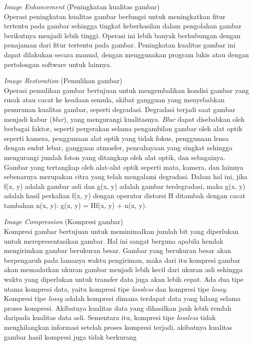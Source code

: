 \begin{packed_enum}
	\item \textit{Image Enhancement} (Peningkatan kualitas gambar)
	\\	Operasi peningkatan kualitas gambar berfungsi untuk meningkatkan fitur tertentu pada gambar sehingga tingkat keberhasilan dalam pengolahan gambar berikutnya menjadi lebih tinggi. Operasi ini lebih banyak berhubungan dengan penajaman dari fitur tertentu pada gambar. Peningkatan kualitas gambar ini dapat dilakukan secara manual, dengan menggunakan program lukis atau dengan pertolongan software untuk lainnya.
	\item \textit{Image Restoration} (Pemulihan gambar)
	\\	Operasi pemulihan gambar bertujuan untuk mengembalikan kondisi gambar yang rusak atau cacat ke keadaan semula, akibat gangguan yang menyebabkan penurunan kualitas gambar, seperti degradasi. Degradasi terjadi saat gambar menjadi kabur (\textit{blur}), yang mengurangi kualitasnya. \textit{Blur} dapat disebabkan oleh berbagai faktor, seperti pergerakan selama pengambilan gambar oleh alat optik seperti kamera, penggunaan alat optik yang tidak fokus, penggunaan lensa dengan sudut lebar, gangguan atmosfer, pencahayaan yang singkat sehingga mengurangi jumlah foton yang ditangkap oleh alat optik, dan sebagainya. Gambar yang tertangkap oleh alat-alat optik seperti mata, kamera, dan lainnya sebenarnya merupakan citra yang telah mengalami degradasi. Dalam hal ini, jika f(x, y) adalah gambar asli dan g(x, y) adalah gambar terdegradasi, maka g(x, y) adalah hasil perkalian f(x, y) dengan operator distorsi H ditambah dengan cacat tambahan n(x, y): g(x, y) = Hf(x, y) + n(x, y).
	\item \textit{Image Compression} (Kompresi gambar)
	\\	Kompresi gambar bertujuan untuk meminimalkan jumlah bit yang diperlukan untuk merepresentasikan gambar. Hal ini sangat berguna apabila hendak mengirimkan gambar berukuran besar. Gambar yang berukuran besar akan berpengaruh pada lamanya waktu pengiriman, maka dari itu kompresi gambar akan memadatkan ukuran gambar menjadi lebih kecil dari ukuran asli sehingga waktu yang diperlukan untuk transfer data juga akan lebih cepat.	
	Ada dua tipe utama kompresi data, yaitu kompresi tipe \textit{lossless} dan kompresi tipe \textit{lossy}. Kompresi tipe \textit{lossy} adalah kompresi dimana terdapat data yang hilang selama proses kompresi. Akibatnya kualitas data yang dihasilkan jauh lebih rendah daripada kualitas data asli. Sementara itu, kompresi tipe \textit{lossless} tidak menghilangkan informasi setelah proses kompresi terjadi, akibatnya kualitas gambar hasil kompresi juga tidak berkurang

\end{packed_enum}

